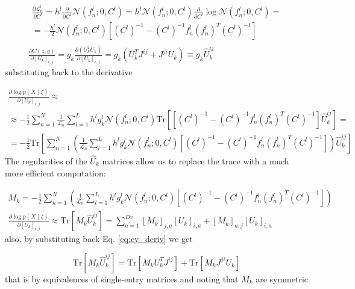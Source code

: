\documentclass{paper}
\begin{document}
\begin{eqnarray}
\begin{split}
\frac{\partial \mathcal{L}_n^l}{\partial C^l} = h^l \frac{\partial}{\partial C^l} \mathcal{N}(f_n^l;0,C^l) = h^l \mathcal{N}(f_n^l;0,C^l) \frac{\partial}{\partial C^l} \log \mathcal{N}(f_n^l;0,C^l) = \\
= -\frac{h^l}{2} \mathcal{N}(f_n^l;0,C^l) \left[ (C^l)^{-1} - (C^l)^{-1} f_n^l (f_n^l)^T (C^l)^{-1} \right]
\end{split} \\
\frac{\partial C(z,g)}{\partial \left[ U_k \right]_{i,j}} = g_k \frac{\partial \left( U_k^T U_k \right)}{\partial \left[ U_k \right]_{i,j}} = g_k \left( U_k^T J^{ij} + J^{ji} U_k \right) \equiv g_k \hat U_k^{ij} \label{eq:cv_deriv}
\end{eqnarray}
%
substituting back to the derivative

\begin{equation}
\begin{split}
\frac{\partial \log p(X \mid \zeta)}{\partial \left[ U_k \right]_{i,j}} \approx \\
\approx  -\frac{1}{2} \sum_{n=1}^N \frac{1}{\mathcal{L}_n}  \sum_{l=1}^{L} h^l g^l_k \mathcal{N}(f_n^l;0,C^l)  \textrm{Tr} \left[ \left[ (C^l)^{-1} - (C^l)^{-1} f_n^l (f_n^l)^T (C^l)^{-1} \right] \hat U_k^{ij} \right] = \\
= -\frac{1}{2} \textrm{Tr} \left[ \sum_{n=1}^N \left(\frac{1}{\mathcal{L}_n}  \sum_{l=1}^{L} h^l g^l_k \mathcal{N}(f_n^l;0,C^l)   \left[ (C^l)^{-1} - (C^l)^{-1} f_n^l (f_n^l)^T (C^l)^{-1} \right] \right) \hat U_k^{ij} \right]
\end{split}
\end{equation}
%
The regularities of the $\hat U_k$ matrices allow us to replace the trace with a much more efficient computation:

\begin{eqnarray}
M_k = -\frac{1}{2} \sum_{n=1}^N \left(\frac{1}{\mathcal{L}_n}  \sum_{l=1}^{L} h^l g^l_k \mathcal{N}(f_n^l;0,C^l)   \left[ (C^l)^{-1} - (C^l)^{-1} f_n^l (f_n^l)^T (C^l)^{-1} \right] \right) \\
\frac{\partial \log p(X \mid \zeta)}{\partial \left[ U_k \right]_{i,j}} \approx \textrm{Tr} \left[M_k \hat U_k^{ij} \right] = \sum_{a=1}^{Dv} \left[ M_k \right]_{j,a} \left[ U_k \right]_{i,a} + \left[ M_k \right]_{a,j} \left[ U_k \right]_{i,a}
\end{eqnarray}
%
also, by substituting back Eq. \ref{eq:cv_deriv} we get

\begin{equation}
\textrm{Tr} \left[M_k \hat U_k^{ij} \right] = \textrm{Tr} \left[M_k U_k^T J^{ij} \right] + \mathrm{Tr} \left[ M_k J^{ji} U_k \right]
\end{equation}
%
that is by equivalences of single-entry matrices and noting that $M_k$ are symmetric
\end{document}
